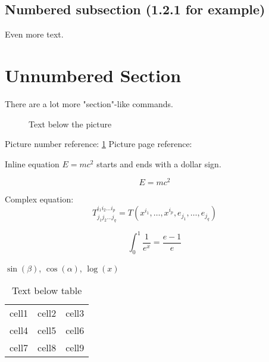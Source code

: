 \documentclass[12pt, a4paper]{article} %
\begin{document}
\subsection{Numbered subsection (1.2.1 for example)}

Even more text.

\section*{Unnumbered Section} %

There are a lot more "section"-like commands.



\begin{figure}[h] %
    \centering
    \caption{Text below the picture}
    \label{fig:mozilla_picture_label}
\end{figure}
 
Picture number reference: \ref{fig:mozilla_picture_label}
Picture page reference: \pageref{fig:mozilla_picture_label} 



Inline equation $E=mc^2$ starts and ends with a dollar sign.

\begin{equation} %
E=mc^2
\end{equation}

Complex equation:
$$T^{i_1 i_2 \dots i_p}_{j_1 j_2 \dots j_q} = T(x^{i_1},\dots,x^{i_p},e_{j_1},\dots,e_{j_q})$$

$$\int_0^1 \frac{1}{e^x} =  \frac{e-1}{e}$$

$\sin(\beta)$, $\cos(\alpha)$, $\log(x)$



\begin{center}

\begin{table}[H] %
\centering

\begin{tabular}{ |l|c|r| } %
\hline                     %
cell1 & cell2 & cell3 \\   %
cell4 & cell5 & cell6 \\  
cell7 & cell8 & cell9 \\
\hline                     %
\end{tabular}

\caption{Text below table}
\label{table:sample_table_label}
\end{table}

\end{center}
\end{document}
